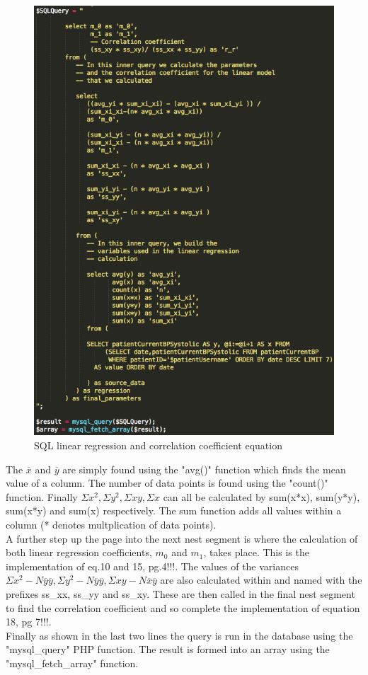 \documentclass[11pt]{article}
\begin{document}
\begin{figure}
\centering
\includegraphics[scale=0.4]{mainSQL.png}
\caption{SQL linear regression and correlation coefficient equation \cite{Mike}} 
\end{figure} 
The $\overline{x}$ and $\overline{y}$ are simply found using the "avg()" function which finds the mean value of a column. The number of data points is found using the "count()" function. Finally $\Sigma x^2, \Sigma y^2, \Sigma xy, \Sigma x$ can all be calculated by sum(x*x), sum(y*y), sum(x*y) and sum(x) respectively. The sum function adds all values within a column (* denotes multplication of data points). 
\\ \indent
A further step up the page into the next nest segment is where the calculation of both linear regression coefficients, $m_0$ and $m_1$, takes place. This is the implementation of eq.10 and 15, pg.4!!!. The values of the variances$\Sigma x^2 -N\overline{y}\overline{y}, \Sigma y^2 - N\overline{y}\overline{y}, \Sigma xy - N\overline{x}\overline{y}$ are also calculated within and named with the prefixes ss\_xx, ss\_yy and ss\_xy. These are then called in the final nest segment to find the correlation coefficient and so complete the implementation of equation 18, pg 7!!!.
\\ \indent
Finally as shown in the last two lines the query is run in the database using the "mysql\_query" PHP function. The result is formed into an array using the "mysql\_fetch\_array" function. 
\end{document}
